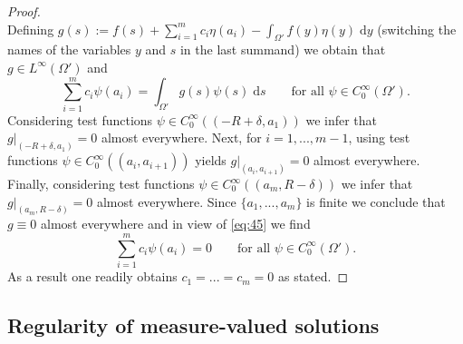 \documentclass[twoside,11pt]{article}
\theoremstyle{definition}
\begin{document}
\begin{proof}
\begin{equation*}
    \end{equation*}
    Defining $g(s) := f(s)  +  \sum_{i = 1}^m c_i \eta(a_i) - \int_{\Omega'} f(y) \eta(y) \; \mathrm{d}y $ (switching the names of the variables $y$ and $s$ in the last summand) we obtain that $g \in L^\infty(\Omega')$ and
    \begin{equation}\label{eq:45}
        \sum_{i = 1}^m c_i \psi(a_i) = \int_{\Omega'} g(s) \psi(s) \; \mathrm{d}s \qquad \textrm{for all $\psi \in C_0^\infty(\Omega')$.}
    \end{equation}
    Considering test functions $\psi \in C_0^\infty((-R+\delta,a_1))$ we infer that $g \vert_{(-R+\delta,a_1)} = 0$ almost everywhere. Next, for $i=1,...,m-1$, using test functions $\psi \in C_0^\infty((a_i,a_{i+1}))$ yields $g \vert_{(a_i,a_{i+1})} = 0$ almost everywhere. Finally, considering  test functions $\psi \in C_0^\infty((a_m,R-\delta))$ we infer that $g \vert_{(a_m,R-\delta)} = 0$ almost everywhere. Since $\{a_1,...,a_m \}$ is finite we conclude that $g \equiv 0$ almost everywhere and in view of \eqref{eq:45}  we find 
    \begin{equation*}
        \sum_{i = 1}^m c_i \psi(a_i) = 0 \qquad \textrm{for all $\psi \in C_0^\infty(\Omega')$}. 
    \end{equation*}
    As a result one readily obtains $c_1=...=c_m = 0$ as stated. 
\end{proof}

\subsection{Regularity of measure-valued solutions}
\end{document}
